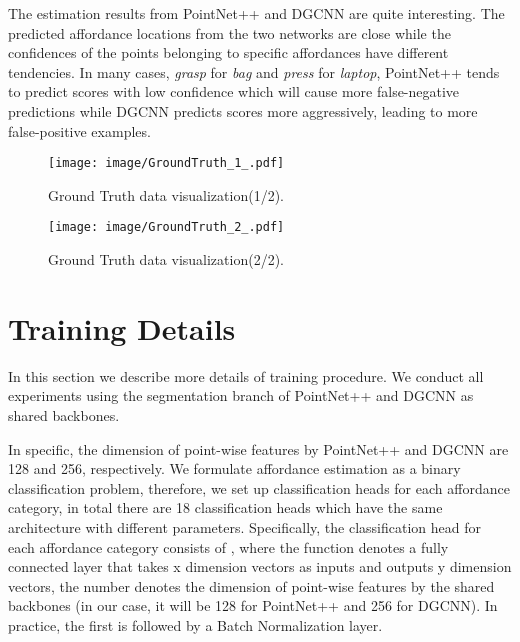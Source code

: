 \documentclass[final]{cvpr}
\begin{document}
The estimation results from PointNet++ and DGCNN are quite interesting. The predicted affordance locations from the two networks are close while the confidences of the points belonging to specific affordances have different tendencies. In many cases, \eg \textit{grasp} for \textit{bag} and \textit{press} for \textit{laptop}, PointNet++ tends to predict scores with low confidence which will cause more false-negative predictions while DGCNN predicts scores more aggressively, leading to more false-positive examples. 

\begin{figure*}[t]
   \begin{center}
      \texttt{[image: image/GroundTruth\_1\_.pdf]}
   \end{center}
   \caption{Ground Truth data visualization(1/2).}
   \label{ground truth 1}
\end{figure*}

\begin{figure*}[t]
   \begin{center}
      \texttt{[image: image/GroundTruth\_2\_.pdf]}
   \end{center}
   \caption{Ground Truth data visualization(2/2).}
   \label{ground truth 2}
\end{figure*}

\section{Training Details} \label{training details}

In this section we describe more details of training procedure. We conduct all experiments using the segmentation branch of PointNet++ and DGCNN as shared backbones. 

In specific, the dimension of point-wise features by PointNet++ and DGCNN are 128 and 256, respectively. We formulate affordance estimation as a binary classification problem, therefore, we set up classification heads for each affordance category, in total there are 18 classification heads which have the same architecture with different parameters. Specifically, the classification head for each affordance category consists of , where the function  denotes a fully connected layer that takes x dimension vectors as inputs and outputs y dimension vectors, the number  denotes the dimension of point-wise features by the shared backbones (in our case, it will be 128 for PointNet++ and 256 for DGCNN). In practice, the first  is followed by a Batch Normalization layer.
\end{document}
